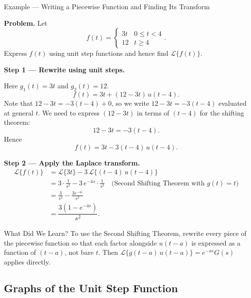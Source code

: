 \documentclass[12pt,a4paper]{article}
\begin{document}
\begin{infobox}{Example --- Writing a Piecewise Function and Finding Its Transform}

\textbf{Problem.} Let
\[
  f(t) = \begin{cases} 3t & 0 \leq t < 4 \\ 12 & t \geq 4 \end{cases}.
\]
Express $f(t)$ using unit step functions and hence find $\mathcal{L}\{f(t)\}$.

\medskip
\textbf{Step 1 --- Rewrite using unit steps.}

Here $g_1(t) = 3t$ and $g_2(t) = 12$.
\[
  f(t) = 3t + (12 - 3t)\,u(t-4).
\]
Note that $12 - 3t = -3(t - 4) + 0$, so we write $12 - 3t = -3(t-4)$
evaluated at general $t$. We need to express $(12 - 3t)$ in terms of $(t-4)$
for the shifting theorem:
\[
  12 - 3t = -3(t - 4).
\]
Hence
\[
  f(t) = 3t - 3(t-4)\,u(t-4).
\]

\textbf{Step 2 --- Apply the Laplace transform.}
\begin{align*}
  \mathcal{L}\{f(t)\}
  &= \mathcal{L}\{3t\} - 3\,\mathcal{L}\{(t-4)\,u(t-4)\} \\
  &= 3 \cdot \frac{1}{s^2} - 3\,e^{-4s} \cdot \frac{1}{s^2}
     \quad \text{(Second Shifting Theorem with } g(t) = t\text{)} \\
  &= \frac{3}{s^2} - \frac{3e^{-4s}}{s^2} \\[4pt]
  &= \boxed{\dfrac{3(1 - e^{-4s})}{s^2}}.
\end{align*}

\end{infobox}

\begin{learnbox}{What Did We Learn?}
To use the Second Shifting Theorem, rewrite every piece of the piecewise
function so that each factor alongside $u(t-a)$ is expressed as a function
of $(t-a)$, not bare $t$. Then $\mathcal{L}\{g(t-a)\,u(t-a)\} = e^{-as}G(s)$
applies directly.
\end{learnbox}

\subsection{Graphs of the Unit Step Function}
\end{document}
